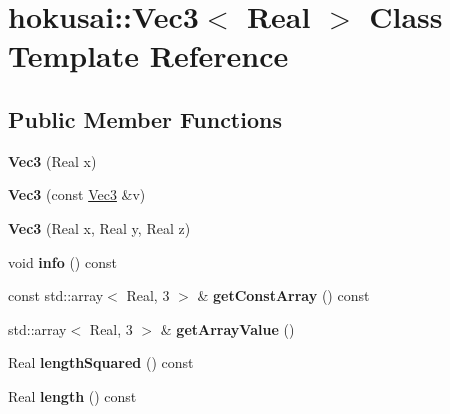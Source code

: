 \hypertarget{classhokusai_1_1Vec3}{\section{hokusai\+:\+:Vec3$<$ Real $>$ Class Template Reference}
\label{classhokusai_1_1Vec3}
}
\subsection*{Public Member Functions}
\begin{DoxyCompactItemize}
\item 
\hypertarget{classhokusai_1_1Vec3_a87f530dd82046b8af40cf3dcb2628a7f}{{\bfseries Vec3} (Real x)}\label{classhokusai_1_1Vec3_a87f530dd82046b8af40cf3dcb2628a7f}

\item 
\hypertarget{classhokusai_1_1Vec3_ac23d3e4a91e9e14a9879557b70946b6b}{{\bfseries Vec3} (const \hyperlink{classhokusai_1_1Vec3}{Vec3} \&v)}\label{classhokusai_1_1Vec3_ac23d3e4a91e9e14a9879557b70946b6b}

\item 
\hypertarget{classhokusai_1_1Vec3_a4bb8d8810d41fc4dd8a55bb87dbc890b}{{\bfseries Vec3} (Real x, Real y, Real z)}\label{classhokusai_1_1Vec3_a4bb8d8810d41fc4dd8a55bb87dbc890b}

\item 
\hypertarget{classhokusai_1_1Vec3_a37447dc02555a1a46f0cd127d147b7ee}{void {\bfseries info} () const }\label{classhokusai_1_1Vec3_a37447dc02555a1a46f0cd127d147b7ee}

\item 
\hypertarget{classhokusai_1_1Vec3_a7b2d87409bb55a1013fbe28e918a5416}{const std\+::array$<$ Real, 3 $>$ \& {\bfseries get\+Const\+Array} () const }\label{classhokusai_1_1Vec3_a7b2d87409bb55a1013fbe28e918a5416}

\item 
\hypertarget{classhokusai_1_1Vec3_a0279990c76062c2d8a6d0d8c3d8c895c}{std\+::array$<$ Real, 3 $>$ \& {\bfseries get\+Array\+Value} ()}\label{classhokusai_1_1Vec3_a0279990c76062c2d8a6d0d8c3d8c895c}

\item 
\hypertarget{classhokusai_1_1Vec3_a27749490f241ee59965f447288ce32f0}{Real {\bfseries length\+Squared} () const }\label{classhokusai_1_1Vec3_a27749490f241ee59965f447288ce32f0}

\item 
\hypertarget{classhokusai_1_1Vec3_a006a4b4dab711006d6ba0c98b448fbf0}{Real {\bfseries length} () const }\label{classhokusai_1_1Vec3_a006a4b4dab711006d6ba0c98b448fbf0}


\end{DoxyCompactItemize}
